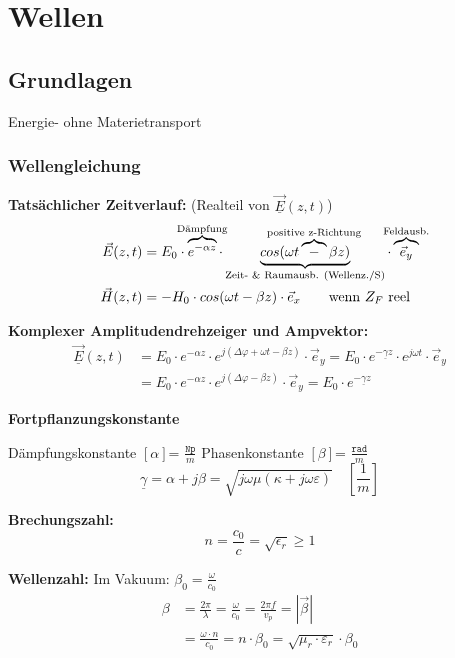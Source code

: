 \section{Wellen}
\subsection{Grundlagen}
Energie- ohne Materietransport

\subsubsection*{Wellengleichung}
\textbf{Tatsächlicher Zeitverlauf:} (Realteil von $\underline{\vec{E}}(z,t)$)
\begin{align*}
    \vec{E}(z,t)
        &= E_0
        \cdot \overbrace{e^{-\alpha z}}^{\mathclap{\text{Dämpfung}}}
        \cdot \underbrace{cos(\omega t \overbrace{-}^{\mathclap{\text{positive z-Richtung}}} \beta z)}_\text{Zeit- \& Raumausb. (Wellenz./S)}
        \cdot \overbrace{\vec{e}_y}^{\mathclap{\text{Feldausb.}}} \\
    \vec{H}(z,t)
        &= - H_0 \cdot cos(\omega t - \beta z) \cdot \vec{e}_x \qquad \text{wenn $Z_F$ reel}
\end{align*}
\vspace{1ex}

\textbf{Komplexer Amplitudendrehzeiger und Ampvektor:}
\begin{align*}
    \underline{\vec{E}}(z,t)
    &= E_0\cdot e^{-\alpha z}\cdot e^{j(\Delta\varphi + \omega t-\beta z)}\cdot\vec{e}_y
    = E_0\cdot e^{-\underline{\gamma}z}\cdot e^{j\omega t}\cdot\vec{e}_y \\
    &= E_0\cdot e^{-\alpha z}\cdot e^{j(\Delta\varphi -\beta z)}\cdot\vec{e}_y
    = E_0\cdot e^{-\underline{\gamma}z}
\end{align*}
\vspace{1ex}

\textbf{Fortpflanzungskonstante}

Dämpfungskonstante $ [\alpha] $= $\frac{\mathtt{Np}}{m}$ \qquad \quad
Phasenkonstante $ [\beta] $= $ \frac{\mathtt{rad}}{m} $
\[\underline{\gamma}=\alpha+j\beta =  \sqrt{j\omega \mu (\kappa + \si{j}\omega \varepsilon)} \quad \left[ \frac{1}{m} \right]\]
 

\textbf{Brechungszahl:}
\[ n = \dfrac{c_0}{c} = \sqrt{\epsilon_r} \geq 1 \]

\textbf{Wellenzahl:}
Im Vakuum: $\beta_{0}=\frac{\omega}{c_{0}}$
\begin{align*}
    \beta & = \frac{2 \pi}{\lambda} = \frac{\omega}{c_0} = \frac{2 \pi f}{v_p} = |\vec{\beta}|                                                                      \\
      	  & = \frac{\omega \cdot n}{c_{0}} = n \cdot \beta_{0}=\sqrt{\mu_{r} \cdot \varepsilon_{r}} \cdot \beta_{0}
\end{align*}

